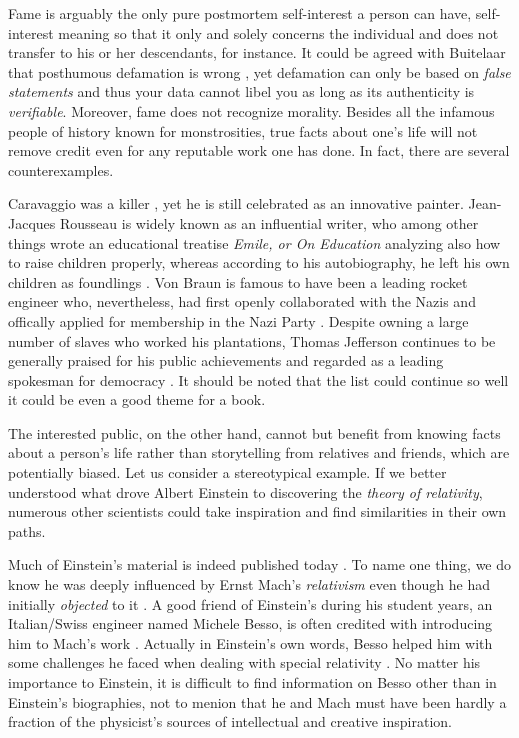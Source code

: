 \documentclass[a4paper]{article}
\begin{document}
Fame is arguably the only pure postmortem self-interest a person can have, self-interest meaning so that it only and solely concerns the individual and does not transfer to his or her descendants, for instance. It could be agreed with Buitelaar that posthumous defamation is wrong \cite{buitelaar}, yet defamation can only be based on \emph{false statements} \cite{leroy} and thus your data cannot libel you as long as its authenticity is \emph{verifiable}. Moreover, fame does not recognize morality. Besides all the infamous people of history known for monstrosities, true facts about one's life will not remove credit even for any reputable work one has done. In fact, there are several counterexamples.

Caravaggio was a killer \cite{caravaggio}, yet he is still celebrated as an innovative painter.
Jean-Jacques Rousseau is widely known as an influential writer, who among other things wrote an educational treatise \textit{Emile, or On Education} analyzing also how to raise children properly, whereas according to his autobiography, he left his own children as foundlings \cite{rousseau}.
Von Braun is famous to have been a leading rocket engineer who, nevertheless, had first openly collaborated with the Nazis and offically applied for membership in the Nazi Party \cite{vonbraun}.
Despite owning a large number of slaves who worked his plantations, Thomas Jefferson continues to be generally praised for his public achievements and regarded as a leading spokesman for democracy \cite{jefferson}. It should be noted that the list could continue so well it could be even a good theme for a book.

The interested public, on the other hand, cannot but benefit from knowing facts about a person's life rather than storytelling from relatives and friends, which are potentially biased. Let us consider a stereotypical example.
If we better understood what drove Albert Einstein to discovering the \textit{theory of relativity}, numerous other scientists could take inspiration and find similarities in their own paths.

Much of Einstein's material is indeed published today \cite{einstein-notes}. To name one thing, we do know he was deeply influenced by Ernst Mach's \textit{relativism} even though he had initially \emph{objected} to it \cite{einstein-inspiration}. A good friend of Einstein's during his student years, an Italian/Swiss engineer named Michele Besso, is often credited with introducing him to Mach's work \cite{einstein-inspiration}. Actually in Einstein's own words, Besso helped him with some challenges he faced when dealing with special relativity \cite{einstein}.
No matter his importance to Einstein, it is difficult to find information on Besso other than in Einstein's biographies, not to menion that he and Mach must have been hardly a fraction of the physicist's sources of intellectual and creative inspiration.
\end{document}
